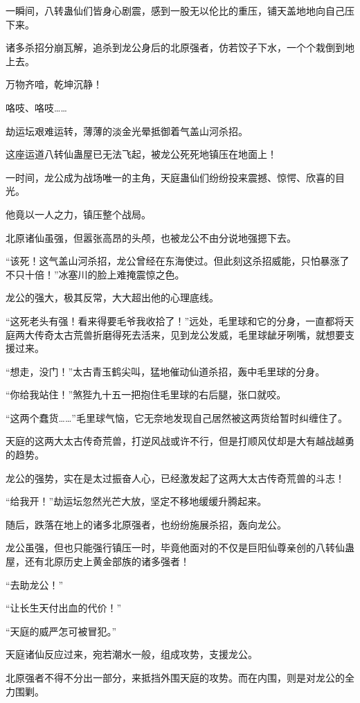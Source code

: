 \begin{this_body}
一瞬间，八转蛊仙们皆身心剧震，感到一股无以伦比的重压，铺天盖地地向自己压下来。

诸多杀招分崩瓦解，追杀到龙公身后的北原强者，仿若饺子下水，一个个栽倒到地上去。

万物齐喑，乾坤沉静！

咯吱、咯吱……

劫运坛艰难运转，薄薄的淡金光晕抵御着气盖山河杀招。

这座运道八转仙蛊屋已无法飞起，被龙公死死地镇压在地面上！

一时间，龙公成为战场唯一的主角，天庭蛊仙们纷纷投来震撼、惊愕、欣喜的目光。

他竟以一人之力，镇压整个战局。

北原诸仙虽强，但嚣张高昂的头颅，也被龙公不由分说地强摁下去。

“该死！这气盖山河杀招，龙公曾经在东海使过。但此刻这杀招威能，只怕暴涨了不只十倍！”冰塞川的脸上难掩震惊之色。

龙公的强大，极其反常，大大超出他的心理底线。

“这死老头有强！看来得要毛爷我收拾了！”远处，毛里球和它的分身，一直都将天庭两大传奇太古荒兽折磨得死去活来，见到龙公发威，毛里球龇牙咧嘴，就想要支援过来。

“想走，没门！”太古青玉鹤尖叫，猛地催动仙道杀招，轰中毛里球的分身。

“你给我站住！”煞狴九十五一把抱住毛里球的右后腿，张口就咬。

“这两个蠢货……”毛里球气恼，它无奈地发现自己居然被这两货给暂时纠缠住了。

天庭的这两大太古传奇荒兽，打逆风战或许不行，但是打顺风仗却是大有越战越勇的趋势。

龙公的强势，实在是太过振奋人心，已经激发起了这两大太古传奇荒兽的斗志！

“给我开！”劫运坛忽然光芒大放，坚定不移地缓缓升腾起来。

随后，跌落在地上的诸多北原强者，也纷纷施展杀招，轰向龙公。

龙公虽强，但也只能强行镇压一时，毕竟他面对的不仅是巨阳仙尊亲创的八转仙蛊屋，还有北原历史上黄金部族的诸多强者！

“去助龙公！”

“让长生天付出血的代价！”

“天庭的威严怎可被冒犯。”

天庭诸仙反应过来，宛若潮水一般，组成攻势，支援龙公。

北原强者不得不分出一部分，来抵挡外围天庭的攻势。而在内围，则是对龙公的全力围剿。


\end{this_body}
